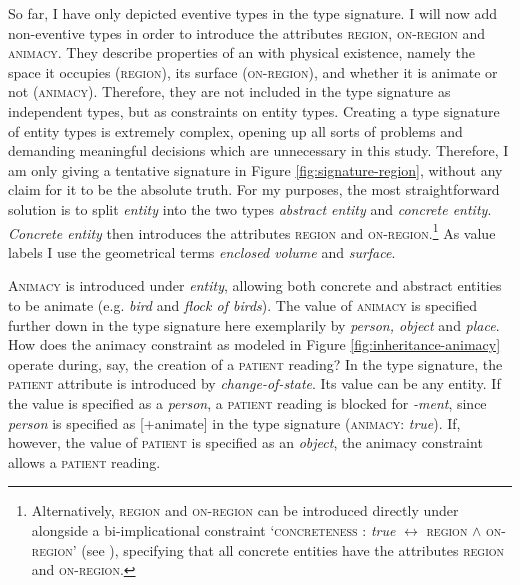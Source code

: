 So far, I have only depicted eventive types in the type signature. I will now add non-eventive types in order to introduce the attributes \textsc{region, on-region} and \textsc{animacy}. 
They describe properties of an  with physical existence, namely the space it occupies (\textsc{region}), its surface (\textsc{on-region}), and whether it is animate or not (\textsc{animacy}). Therefore, they are not included in the type signature as independent types, but as constraints on entity types.
Creating a type signature of entity types is extremely complex, opening up all sorts of problems and demanding meaningful decisions which are unnecessary in this study. Therefore, I am only giving a tentative signature in Figure \ref{fig:signature-region}, without any claim for it to be the absolute truth.
For my purposes, the most straightforward solution is to split \textit{entity} into the two types \textit{abstract entity} and \textit{concrete entity}. \textit{Concrete entity} then introduces the attributes \textsc{region} and \textsc{on-region}.\footnote{Alternatively, \textsc{region} and \textsc{on-region} can be introduced directly under {} alongside a bi-implicational constraint `\textsc{concreteness :} \textit{true} $\leftrightarrow$ \textsc{region} $\wedge$ \textsc{on-region}' (see \citealt[8]{Gamerschlag.2014a}), specifying that all concrete entities have the attributes \textsc{region} and \textsc{on-region}.} As value labels I use the geometrical terms \textit{enclosed volume} and \textit{surface}.

\textsc{Animacy} is introduced under \textit{entity}, allowing both concrete and abstract entities to be animate (e.g. \textit{bird} and \textit{flock of birds}).
The value of \textsc{animacy} is specified further down in the type signature  \textendash{}  here exemplarily by \textit{person, object} and \textit{place}. 
How does the animacy constraint as modeled in Figure \ref{fig:inheritance-animacy} operate during, say, the creation of a \textsc{patient} reading? In the type signature, the \textsc{patient} attribute is introduced by \textit{change-of-state}. Its value can be any entity. If the value is specified as a \textit{person}, a \textsc{patient} reading is blocked for \textit{-ment}, since \textit{person} is specified as [+animate] in the type signature (\textsc{animacy:} \textit{true}). If, however, the value of \textsc{patient} is specified as an \textit{object}, the animacy constraint allows a \textsc{patient} reading.

